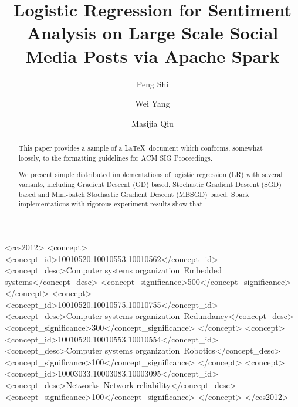 \documentclass[sigconf]{acmart}
\begin{document}
\title{Logistic Regression for Sentiment Analysis on Large Scale Social Media Posts via Apache Spark}


\author{Peng Shi}

\author{Wei Yang}

\author{Masijia Qiu}



\begin{abstract}
This paper provides a sample of a \LaTeX\ document which conforms,
somewhat loosely, to the formatting guidelines for
ACM SIG Proceedings.
\end{abstract}

%
%
\begin{CCSXML}
<ccs2012>
 <concept>
  <concept_id>10010520.10010553.10010562</concept_id>
  <concept_desc>Computer systems organization~Embedded systems</concept_desc>
  <concept_significance>500</concept_significance>
 </concept>
 <concept>
  <concept_id>10010520.10010575.10010755</concept_id>
  <concept_desc>Computer systems organization~Redundancy</concept_desc>
  <concept_significance>300</concept_significance>
 </concept>
 <concept>
  <concept_id>10010520.10010553.10010554</concept_id>
  <concept_desc>Computer systems organization~Robotics</concept_desc>
  <concept_significance>100</concept_significance>
 </concept>
 <concept>
  <concept_id>10003033.10003083.10003095</concept_id>
  <concept_desc>Networks~Network reliability</concept_desc>
  <concept_significance>100</concept_significance>
 </concept>
</ccs2012>
\end{CCSXML}


\maketitle

\begin{abstract}

We present simple distributed implementations of logistic regression (LR) with several variants, including Gradient Descent (GD) based, Stochastic Gradient Descent (SGD) based and Mini-batch Stochastic Gradient Descent (MBSGD) based. Spark implementations with rigorous experiment results show that

\end{abstract}
\end{document}
